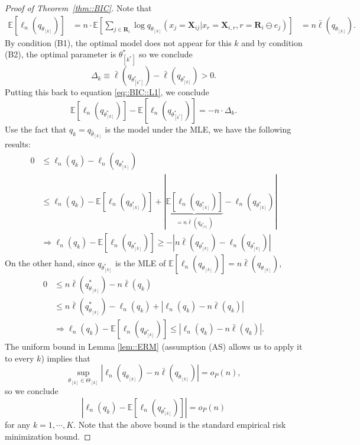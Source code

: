 \documentclass[aos, preprint]{imsart}
\theoremstyle{plain}
\theoremstyle{definition}
\let\hat\widehat
\newcommand{\E}{\mbox{$\mathbb{E}$}}
\newcommand{\bX}{\mathbf{X}}
\newcommand{\bR}{\mathbf{R}}
\begin{document}
\begin{appendix}
\begin{proof}[Proof of Theorem~\ref{thm::BIC}]
Note that 
\begin{equation}
\begin{aligned}
\E\left[ \ell_{n}(q_{\theta_{[k]}})\right] & =n \cdot \E\left[ \sum_{j \in \bR_i} \log q_{\theta_{[k]}}(x_j = \bX_{ij}|x_{r} = \bX_{i, r}, r = \bR_i\ominus e_j)\right]
& = n \bar \ell(q_{\theta_{[k]}}).
\end{aligned}
\label{eq::BIC::L1}
\end{equation}
By condition (B1), the optimal model does not appear for this $k$ 
and by condition (B2), the optimal parameter is $\theta^*_{[k^*]}$
so we conclude
$$
\Delta_k \equiv \bar \ell(q_{\theta^*_{[k^*]}}) -\bar  \ell(q_{\theta^*_{[k]}}) >0 . 
$$
Putting this back to equation \eqref{eq::BIC::L1}, we conclude 
\begin{equation}
\E\left[ \ell_{n}(q_{\theta^*_{[k]}})\right] - \E\left[ \ell_{n}(q_{\theta^*_{[k^*]}})\right]  = -n \cdot \Delta_k.
\label{eq::BIC::L2}
\end{equation}
Use the fact that $q_k = q_{\hat \theta_{[k]}}$ is the model under the MLE,
we have the following results:
\begin{align*}
0 &\leq \ell_{n}(q_k) - \ell_{n}(q_{\theta^*_{[k]}})\\
&\leq \ell_{n}(q_k) -\E\left[ \ell_{n}(q_{\theta^*_{[k]}})\right] + {\left|\underbrace{\E\left[ \ell_{n}(q_{\theta^*_{[k]}})\right]}_{= n \bar \ell(q_{\theta^*_{[k]}})} - \ell_{n}(q_{\theta^*_{[k]}})\right|}\\
&\Rightarrow \ell_{n}(q_k)- \E\left[ \ell_{n}(q_{\theta^*_{[k]}})\right]  \geq -\left|n \bar \ell(q_{\theta^*_{[k]}}) - \ell_{n}(q_{\theta^*_{[k]}})\right|
\end{align*}
On the other hand, since $q_{\theta^*_{[k]}}$ is the MLE of $\E\left[ \ell_{n}(q_{\theta_{[k]}})\right] = n \bar \ell(q_{\theta_{[k]}}) $,
\begin{align*}
0& \leq  n \bar \ell(q^*_{\theta_{[k]}}) - n\bar \ell(q_k)\\
& \leq  n \bar \ell(q^*_{\theta_{[k]}}) -  \ell_{n}(q_k) +\left| \ell_{n}(q_k) - n\bar \ell(q_k)\right|\\
&\Rightarrow\ell_{n}(q_k)  - \E\left[ \ell_{n}(q_{\theta^*_{[k]}})\right]  \leq \left| \ell_{n}(q_k) - n\bar \ell(q_k)\right|. 
\end{align*}
The uniform bound in  Lemma \ref{lem::ERM} (assumption (AS) allows us to apply it
to every $k$) implies that 
$$
\sup_{\theta_{[k]}\in\Theta_{[k]}}\left| \ell_{n}(q_{\theta_{[k]}}) - n\bar \ell(q_{\theta_{[k]}})\right| = o_P(n),
$$
so we conclude
\begin{equation}
\left|\ell_{n}(q_k) - \E\left[ \ell_{n}(q_{\theta^*_{[k]}})\right]\right| 
 = o_P\left(n\right)
\label{eq::BIC::L3}
\end{equation}
for any $k=1,\cdots, K$. Note that the above bound is the standard empirical risk minimization bound. 


\end{proof}
\end{appendix}
\end{document}
